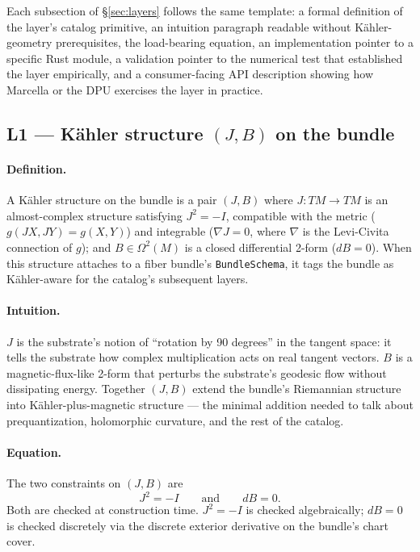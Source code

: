 \documentclass[11pt,letterpaper]{article}
\begin{document}
Each subsection of \S\ref{sec:layers} follows the same template: a
formal definition of the layer's catalog primitive, an intuition
paragraph readable without K\"ahler-geometry prerequisites, the
load-bearing equation, an implementation pointer to a specific Rust
module, a validation pointer to the numerical test that established
the layer empirically, and a consumer-facing API description showing
how Marcella or the DPU exercises the layer in practice.

\subsection{L1 --- K\"ahler structure $(J, B)$ on the bundle}

\paragraph{Definition.}
A K\"ahler structure on the bundle is a pair $(J, B)$ where
$J: TM \to TM$ is an almost-complex structure satisfying $J^2 = -I$,
compatible with the metric ($g(JX, JY) = g(X, Y)$) and integrable
($\nabla J = 0$, where $\nabla$ is the Levi-Civita connection of
$g$); and $B \in \Omega^2(M)$ is a closed differential 2-form
($dB = 0$). When this structure attaches to a fiber bundle's
\texttt{BundleSchema}, it tags the bundle as K\"ahler-aware for the
catalog's subsequent layers.

\paragraph{Intuition.}
$J$ is the substrate's notion of ``rotation by 90 degrees'' in the
tangent space: it tells the substrate how complex multiplication
acts on real tangent vectors. $B$ is a magnetic-flux-like 2-form
that perturbs the substrate's geodesic flow without dissipating
energy. Together $(J, B)$ extend the bundle's Riemannian structure
into K\"ahler-plus-magnetic structure --- the minimal addition
needed to talk about prequantization, holomorphic curvature, and
the rest of the catalog.

\paragraph{Equation.}
The two constraints on $(J, B)$ are
\[
J^2 = -I \qquad \text{and} \qquad dB = 0.
\]
Both are checked at construction time. $J^2 = -I$ is checked
algebraically; $dB = 0$ is checked discretely via the discrete
exterior derivative on the bundle's chart cover.
\end{document}

